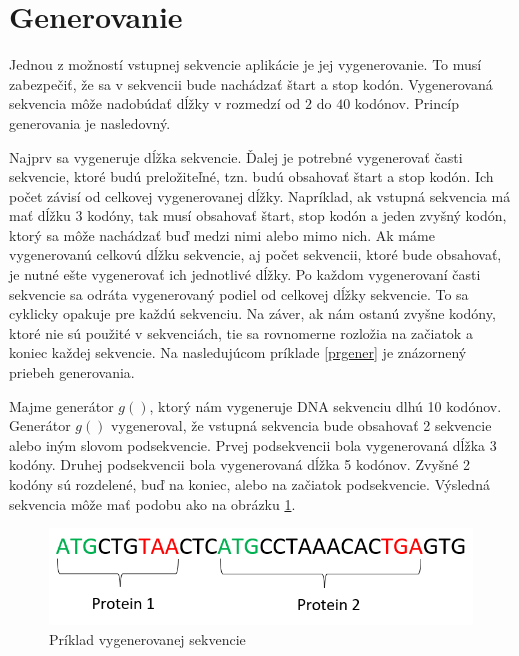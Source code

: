 \section{Generovanie}
\label{gener}

Jednou z možností vstupnej sekvencie aplikácie je jej vygenerovanie. To musí zabezpečiť, že sa v sekvencii bude nachádzať štart a stop kodón. Vygenerovaná sekvencia môže nadobúdať dĺžky v rozmedzí od $2$ do $40$ kodónov. Princíp generovania je nasledovný. 

Najprv sa vygeneruje dĺžka sekvencie. Ďalej je potrebné vygenerovať časti sekvencie, ktoré budú preložiteľné, tzn. budú obsahovať štart a stop kodón. Ich počet závisí od celkovej vygenerovanej dĺžky. Napríklad, ak vstupná sekvencia má mať dĺžku $3$ kodóny, tak musí obsahovať štart, stop kodón a jeden zvyšný kodón, ktorý sa môže nachádzať buď medzi nimi alebo mimo nich. Ak máme vygenerovanú celkovú dĺžku sekvencie, aj počet sekvencii, ktoré bude obsahovať, je nutné ešte vygenerovať ich jednotlivé dĺžky. Po každom vygenerovaní časti sekvencie sa odráta vygenerovaný podiel od celkovej dĺžky sekvencie. To sa cyklicky opakuje pre každú sekvenciu. Na záver, ak nám ostanú zvyšne kodóny, ktoré nie sú použité v sekvenciách, tie sa rovnomerne rozložia na začiatok a koniec každej sekvencie. Na nasledujúcom príklade \ref{prgener} je znázornený priebeh generovania. 

\begin{theorem}
\label{prgener}
\normalfont Majme generátor $g()$, ktorý nám vygeneruje DNA sekvenciu dlhú 10 kodónov. Generátor $g()$ vygeneroval, že vstupná sekvencia bude obsahovať 2 sekvencie alebo iným slovom podsekvencie. Prvej podsekvencii bola vygenerovaná dĺžka 3 kodóny. Druhej podsekvencii bola vygenerovaná dĺžka 5 kodónov. Zvyšné 2 kodóny sú rozdelené, buď na koniec, alebo na začiatok podsekvencie. Výsledná sekvencia môže mať podobu ako na obrázku \ref{generobr}. 
\begin{figure}[!ht]
\centering
\includegraphics[scale =0.7]{obrazky-figures/proteingener.png}
\caption{Príklad vygenerovanej sekvencie}
\label{generobr}
\end{figure}
\end{theorem}




